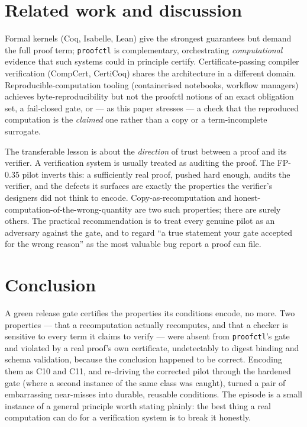 \documentclass[11pt,a4paper]{amsart}
\theoremstyle{plain}
\theoremstyle{definition}
\newcommand{\proofctl}{\texttt{proofctl}}
\newcommand{\CtenA}{\textsf{C10}}
\newcommand{\CelevenA}{\textsf{C11}}
\begin{document}
\section{Related work and discussion}

Formal kernels (Coq, Isabelle, Lean) give the strongest guarantees but demand the
full proof term; \proofctl{} is complementary, orchestrating \emph{computational}
evidence that such systems could in principle certify. Certificate-passing
compiler verification (CompCert, CertiCoq) shares the architecture in a different
domain. Reproducible-computation tooling (containerised notebooks, workflow
managers) achieves byte-reproducibility but not the proofctl notions of an exact
obligation set, a fail-closed gate, or --- as this paper stresses --- a check
that the reproduced computation is the \emph{claimed} one rather than a copy or a
term-incomplete surrogate.

The transferable lesson is about the \emph{direction} of trust between a proof
and its verifier. A verification system is usually treated as auditing the proof.
The FP-0.35 pilot inverts this: a sufficiently real proof, pushed hard enough,
audits the verifier, and the defects it surfaces are exactly the properties the
verifier's designers did not think to encode. Copy-as-recomputation and
honest-computation-of-the-wrong-quantity are two such properties; there are
surely others. The practical recommendation is to treat every genuine pilot as an
adversary against the gate, and to regard ``a true statement your gate accepted
for the wrong reason'' as the most valuable bug report a proof can file.

\section{Conclusion}

A green release gate certifies the properties its conditions encode, no more. Two
properties --- that a recomputation actually recomputes, and that a checker is
sensitive to every term it claims to verify --- were absent from \proofctl{}'s
gate and violated by a real proof's own certificate, undetectably to digest
binding and schema validation, because the conclusion happened to be correct.
Encoding them as \CtenA{} and \CelevenA{}, and re-driving the corrected pilot
through the hardened gate (where a second instance of the same class was caught),
turned a pair of embarrassing near-misses into durable, reusable conditions. The
episode is a small instance of a general principle worth stating plainly: the
best thing a real computation can do for a verification system is to break it
honestly.
\end{document}
